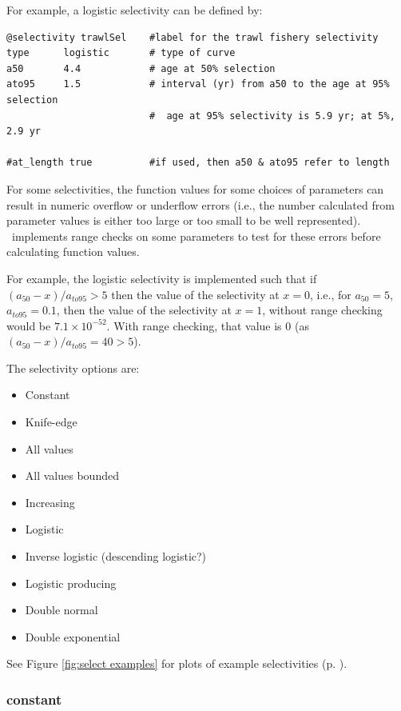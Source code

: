 For example, a logistic selectivity can be defined by:

{\small{\begin{verbatim}
@selectivity trawlSel    #label for the trawl fishery selectivity
type      logistic       # type of curve
a50       4.4            # age at 50% selection
ato95     1.5            # interval (yr) from a50 to the age at 95% selection
                         #  age at 95% selectivity is 5.9 yr; at 5%, 2.9 yr

#at_length true          #if used, then a50 & ato95 refer to length
\end{verbatim}}}

For some selectivities, the function values for some choices of parameters can result in numeric overflow or underflow errors (i.e., the number calculated from parameter values is either too large or too small to be well represented). \CNAME~implements range checks on some parameters to test for these errors before calculating function values.

For example, the logistic selectivity is implemented such that if $(a_{50}-x)/a_{to95} > 5$ then the value of the selectivity at $x=0$, i.e., for $a_{50}=5$, $a_{to95}=0.1$, then the value of the selectivity at $x=1$, without range checking would be $7.1 \times 10^{-52}$. With range checking, that value is $0$ (as $(a_{50}-x)/a_{to95}=40 > 5$).

The selectivity options are:

\begin{itemize}
  \item Constant
  \item Knife-edge
  \item All values
  \item All values bounded
  \item Increasing
  \item Logistic
  \item Inverse logistic (descending logistic?)
  \item Logistic producing
  \item Double normal
  \item Double exponential
\end{itemize}

See Figure \ref{fig:select examples} for plots of example selectivities (p. \pageref{fig:select examples}).

\subsubsection[Constant]{{constant}}

